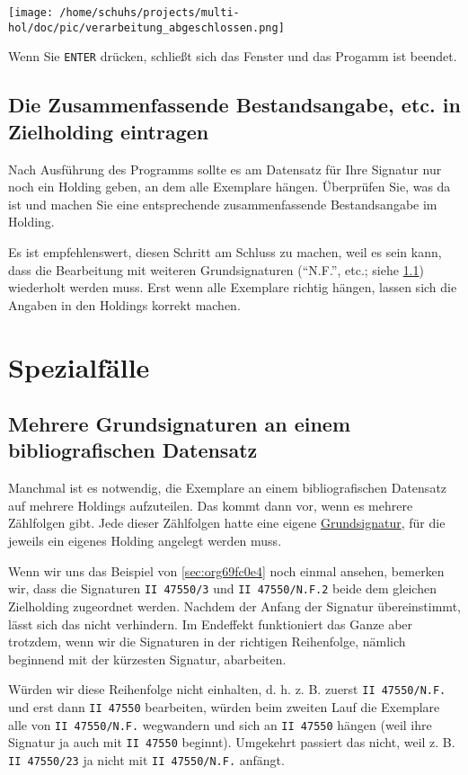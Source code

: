 \documentclass[10pt, a4paper]{scrartcl}
\begin{document}
\begin{center}
\texttt{[image: /home/schuhs/projects/multi-hol/doc/pic/verarbeitung\_abgeschlossen.png]}
\end{center}

Wenn Sie \texttt{ENTER} drücken, schließt sich das Fenster und das Progamm ist beendet.
\subsection{Die Zusammenfassende Bestandsangabe, etc. in Zielholding eintragen}
\label{sec:orgbdbfbe3}
Nach Ausführung des Programms sollte es am Datensatz für Ihre Signatur nur
noch ein Holding geben, an dem alle Exemplare hängen. Überprüfen Sie, was
da ist und machen Sie eine entsprechende zusammenfassende Bestandsangabe
im Holding.

Es ist empfehlenswert, diesen Schritt am Schluss zu machen, weil es sein
kann, dass die Bearbeitung mit weiteren Grundsignaturen ("`N.F."', etc.;
siehe \ref{sec:org2eb550b})
wiederholt werden muss. Erst wenn alle Exemplare richtig hängen, lassen
sich die Angaben in den Holdings korrekt machen.
\section{Spezialfälle}
\label{sec:orgf4176c4}
\subsection{Mehrere Grundsignaturen an einem bibliografischen Datensatz}
\label{sec:org2eb550b}
Manchmal ist es notwendig, die Exemplare an einem bibliografischen
Datensatz auf mehrere Holdings aufzuteilen. Das kommt dann vor, wenn es
mehrere Zählfolgen gibt. Jede dieser Zählfolgen hatte eine eigene \hyperref[sec:org9ba1d80]{Grundsignatur}, 
für die jeweils ein eigenes Holding angelegt werden muss.

Wenn wir uns das Beispiel von \ref{sec:org69fc0e4} noch einmal ansehen,
bemerken wir, dass die Signaturen \texttt{II 47550/3} und \texttt{II 47550/N.F.2} beide
dem gleichen Zielholding zugeordnet werden. Nachdem der Anfang der
Signatur übereinstimmt, lässt sich das nicht verhindern. Im Endeffekt
funktioniert das Ganze aber trotzdem, wenn wir die Signaturen in der richtigen
Reihenfolge, nämlich beginnend mit der kürzesten Signatur, abarbeiten.

Würden wir diese Reihenfolge nicht einhalten, d. h. z. B. zuerst \texttt{II
      47550/N.F.} und erst dann \texttt{II 47550} bearbeiten, würden beim zweiten Lauf
die Exemplare alle von \texttt{II 47550/N.F.} wegwandern und sich an \texttt{II 47550}
hängen (weil ihre Signatur ja auch mit \texttt{II 47550} beginnt). Umgekehrt
passiert das nicht, weil z. B. \texttt{II 47550/23} ja nicht mit \texttt{II 47550/N.F.}
anfängt.
\end{document}
